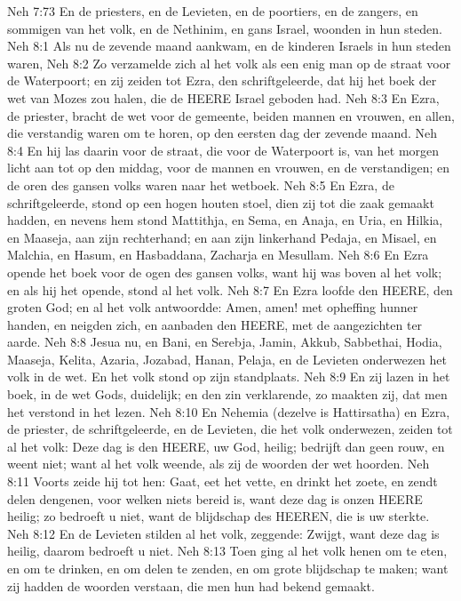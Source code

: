 Neh 7:73  En de priesters, en de Levieten, en de poortiers, en de zangers, en sommigen van het volk, en de Nethinim, en gans Israel, woonden in hun steden.
Neh 8:1  Als nu de zevende maand aankwam, en de kinderen Israels in hun steden waren,
Neh 8:2  Zo verzamelde zich al het volk als een enig man op de straat voor de Waterpoort; en zij zeiden tot Ezra, den schriftgeleerde, dat hij het boek der wet van Mozes zou halen, die de HEERE Israel geboden had.
Neh 8:3  En Ezra, de priester, bracht de wet voor de gemeente, beiden mannen en vrouwen, en allen, die verstandig waren om te horen, op den eersten dag der zevende maand.
Neh 8:4  En hij las daarin voor de straat, die voor de Waterpoort is, van het morgen licht aan tot op den middag, voor de mannen en vrouwen, en de verstandigen; en de oren des gansen volks waren naar het wetboek.
Neh 8:5  En Ezra, de schriftgeleerde, stond op een hogen houten stoel, dien zij tot die zaak gemaakt hadden, en nevens hem stond Mattithja, en Sema, en Anaja, en Uria, en Hilkia, en Maaseja, aan zijn rechterhand; en aan zijn linkerhand Pedaja, en Misael, en Malchia, en Hasum, en Hasbaddana, Zacharja en Mesullam.
Neh 8:6  En Ezra opende het boek voor de ogen des gansen volks, want hij was boven al het volk; en als hij het opende, stond al het volk.
Neh 8:7  En Ezra loofde den HEERE, den groten God; en al het volk antwoordde: Amen, amen! met opheffing hunner handen, en neigden zich, en aanbaden den HEERE, met de aangezichten ter aarde.
Neh 8:8  Jesua nu, en Bani, en Serebja, Jamin, Akkub, Sabbethai, Hodia, Maaseja, Kelita, Azaria, Jozabad, Hanan, Pelaja, en de Levieten onderwezen het volk in de wet. En het volk stond op zijn standplaats.
Neh 8:9  En zij lazen in het boek, in de wet Gods, duidelijk; en den zin verklarende, zo maakten zij, dat men het verstond in het lezen.
Neh 8:10  En Nehemia (dezelve is Hattirsatha) en Ezra, de priester, de schriftgeleerde, en de Levieten, die het volk onderwezen, zeiden tot al het volk: Deze dag is den HEERE, uw God, heilig; bedrijft dan geen rouw, en weent niet; want al het volk weende, als zij de woorden der wet hoorden.
Neh 8:11  Voorts zeide hij tot hen: Gaat, eet het vette, en drinkt het zoete, en zendt delen dengenen, voor welken niets bereid is, want deze dag is onzen HEERE heilig; zo bedroeft u niet, want de blijdschap des HEEREN, die is uw sterkte.
Neh 8:12  En de Levieten stilden al het volk, zeggende: Zwijgt, want deze dag is heilig, daarom bedroeft u niet.
Neh 8:13  Toen ging al het volk henen om te eten, en om te drinken, en om delen te zenden, en om grote blijdschap te maken; want zij hadden de woorden verstaan, die men hun had bekend gemaakt.
